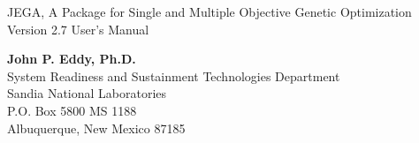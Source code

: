 \documentclass[letterpaper]{book}
\begin{document}
\begin{titlepage}
\begin{center}
\vspace*{1.5cm} {\LARGE JEGA, A Package for Single and Multiple Objective Genetic Optimization}\\
\vspace*{1cm}
{\LARGE Version 2.7 User's Manual}\\
\vspace*{1cm}

{\large \bf John P. Eddy, Ph.D.}\\
{\large System Readiness and Sustainment Technologies Department}\\
\vspace*{0.5cm}
{\large Sandia National Laboratories}\\
{\large P.O. Box 5800 MS 1188}\\
{\large Albuquerque, New Mexico 87185}\\
\vspace*{1cm}

\newpage

\end{center}


\newpage


 \setcounter{page}{3}
\end{titlepage}

\tableofcontents


\setcounter{secnumdepth}{-1} %

\setcounter{secnumdepth}{2} %











\end{document}
